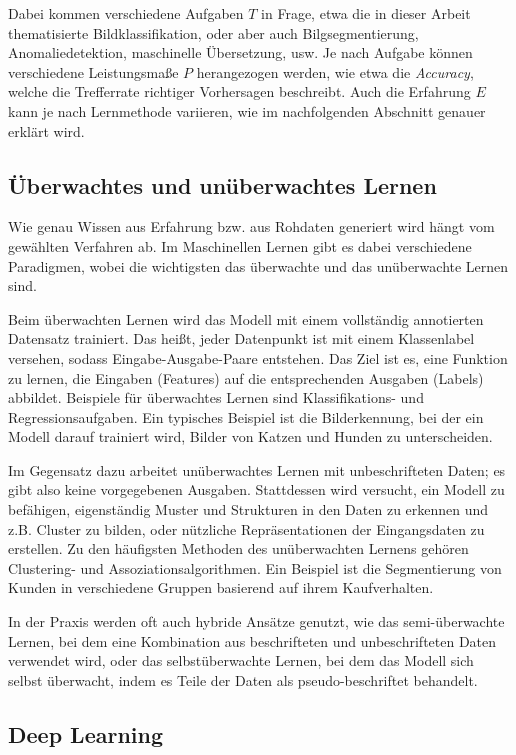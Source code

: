 Dabei kommen verschiedene Aufgaben $T$ in Frage, etwa die in dieser Arbeit thematisierte Bildklassifikation, oder aber auch Bilgsegmentierung, Anomaliedetektion, maschinelle Übersetzung, usw. Je nach Aufgabe können verschiedene Leistungsmaße $P$ herangezogen werden, wie etwa die \textit{Accuracy}, welche die Trefferrate richtiger Vorhersagen beschreibt. Auch die Erfahrung $E$ kann je nach Lernmethode variieren, wie im nachfolgenden Abschnitt genauer erklärt wird.

\subsection{Überwachtes und unüberwachtes Lernen}

Wie genau Wissen aus Erfahrung bzw. aus Rohdaten generiert wird hängt vom gewählten Verfahren ab. Im Maschinellen Lernen gibt es dabei verschiedene Paradigmen, wobei die wichtigsten das überwachte und das unüberwachte Lernen sind.

Beim überwachten Lernen wird das Modell mit einem vollständig annotierten Datensatz trainiert. Das heißt, jeder Datenpunkt ist mit einem Klassenlabel versehen, sodass Eingabe-Ausgabe-Paare entstehen. Das Ziel ist es, eine Funktion zu lernen, die Eingaben (Features) auf die entsprechenden Ausgaben (Labels) abbildet. Beispiele für überwachtes Lernen sind Klassifikations- und Regressionsaufgaben. Ein typisches Beispiel ist die Bilderkennung, bei der ein Modell darauf trainiert wird, Bilder von Katzen und Hunden zu unterscheiden.

Im Gegensatz dazu arbeitet unüberwachtes Lernen mit unbeschrifteten Daten; es gibt also keine vorgegebenen Ausgaben. Stattdessen wird versucht, ein Modell zu befähigen, eigenständig Muster und Strukturen in den Daten zu erkennen und z.B. Cluster zu bilden, oder nützliche Repräsentationen der Eingangsdaten zu erstellen. Zu den häufigsten Methoden des unüberwachten Lernens gehören Clustering- und Assoziationsalgorithmen. Ein Beispiel ist die Segmentierung von Kunden in verschiedene Gruppen basierend auf ihrem Kaufverhalten.

In der Praxis werden oft auch hybride Ansätze genutzt, wie das semi-überwachte Lernen, bei dem eine Kombination aus beschrifteten und unbeschrifteten Daten verwendet wird, oder das selbstüberwachte Lernen, bei dem das Modell sich selbst überwacht, indem es Teile der Daten als pseudo-beschriftet behandelt.

\subsection{Deep Learning}


